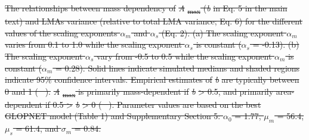 \documentclass[
  12pt,
  letterpaper,
  DIV=11,
  numbers=noendperiod]{scrartcl}
\numberwithin{equation}{section} %
\providecommand{\DIFdel}[1]{{\protect\color{red}\sout{#1}}}                      %
\begin{document}






{%
\DIFdel{The relationships between mass
dependency of }\emph{\DIFdel{A}}%
\DIFdel{\textsubscript{max} (}\emph{\DIFdel{b}} %
\DIFdel{in Eq. 5 in the main
text) and LMAs variance (relative to total LMA variance; Eq. 6) for the
different values of the scaling exponents \(\alpha_m\) and \(\alpha_s\)
(Eq. 2). (a) The scaling exponent \(\alpha_m\) varies from 0.1 to 1.0
while the scaling exponent \(\alpha_s\) is constant (\(\alpha_s\) =
-0.13). (b) The scaling exponent \(\alpha_s\) vary from -0.5 to 0.5
while the scaling exponent \(\alpha_m\) is constant (\(\alpha_m\) =
0.28). Solid lines indicate simulated medians and shaded regions
indicate 95\% confidence intervals. Empirical estimates of }\emph{\DIFdel{b}} %
\DIFdel{are
typically between 0 and 1 (\mbox{%
\citeproc{ref-Osnas2018}{Osnas et al.,
2018}}\hspace{0pt}%
). }\emph{\DIFdel{A}}%
\DIFdel{\textsubscript{max} is primarily mass-dependent if
}\emph{\DIFdel{b}} %
\DIFdel{\textgreater{} 0.5, and primarily area-dependent if 0.5
\textgreater{} }\emph{\DIFdel{b}} %
\DIFdel{\textgreater{} 0 (\mbox{%
\citeproc{ref-Osnas2018}{Osnas
et al., 2018}}\hspace{0pt}%
). Parameter values are based on the best GLOPNET model
(Table 1) and Supplementary Section 5: \(\alpha_0\) = 1.77, \(\mu_m\) =
56.4, \(\mu_s\) = 61.4, and \(\sigma_m\) = 0.84.}}




\end{document}
